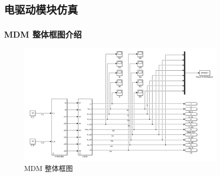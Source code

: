 \begin{itemize}
	\clearpage
	\subsection{电驱动模块仿真}
	
	\subsubsection{MDM 整体框图介绍}
	\begin{figure}[htbp]
		\centering
		\includegraphics[width=0.9\textwidth]{fig/simulink/MDM_simulink1.png}
		\caption{MDM 整体框图}\label{fig:MDM_simulink}
	\end{figure}
	

\end{itemize}
